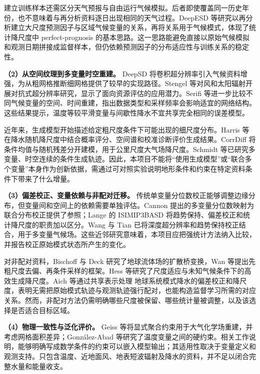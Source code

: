 建立训练样本还需区分天气预报与自由运行气候模拟。后者即使覆盖同一历史年份，也不意味着与再分析资料逐日出现相同的天气过程。DeepESD 等研究以再分析建立大尺度预测因子与区域气候变量的关系，再将关系用于气候模式，体现了统计降尺度中 perfect-prognosis 的基本思路\cite{Bano2022DeepESD}。这一思路能避免直接以原始气候模拟和观测日期拼接成监督样本，但仍依赖预测因子的分布适应性与训练关系的稳定性。

\textbf{（2）从空间纹理到多变量时空重建。}
DeepSD 将卷积超分辨率引入气候资料增强，为从粗网格推断细网格提供了较早的实现路径\cite{DeepSD2017}。Stengel 等对风和太阳辐射开展对抗式超分辨率研究，显示了面向资源评估的应用潜力\cite{Stengel2020}。Serifi 等进一步比较不同气候变量的空间、时间重建，指出数据类型和采样频率会影响适宜的网络结构\cite{Serifi2021}。这些结果提示，温度等较平滑变量与间歇性降水不宜共享完全相同的误差模型。

近年来，生成模型开始描述给定粗尺度条件下可能出现的细尺度分布。Harris 等在降水随机降尺度中结合概率评分、空间谱和校准诊断评价生成结果\cite{Harris2022}。CorrDiff 将条件均值与随机残差分开建模，用于公里尺度大气场降尺度\cite{Mardani2025CorrDiff}。Schmidt 等已研究多变量、时空连续的条件生成轨迹\cite{Schmidt2025Coherent}。因此，本项目不能将“使用生成模型”或“联合多个变量”本身作为创新依据，需通过可对照实验说明地形条件和约束在特定资料条件下带来了什么增量。

\textbf{（3）偏差校正、变量依赖与非配对迁移。}
传统单变量分位数校正能够调整边缘分布，但变量间和空间上的依赖需要单独评估。Cannon 提出的多变量分位数映射为联合分布校正提供了参照\cite{Cannon2018MBCn}；Lange 的 ISIMIP3BASD 将趋势保持、偏差校正和统计降尺度的职责加以区分\cite{Lange2019ISIMIP}。Wang 与 Tian 已将深度超分辨率和趋势保持校正结合，用于多变量气候场\cite{Trend2024}。这些近邻研究意味着，本项目应把强统计方法纳入比较，并报告校正原始模式状态所产生的变化。

对非配对资料，Bischoff 与 Deck 研究了地球流体场的扩散桥变换\cite{Bischoff2024Unpaired}，Wan 等提出先粗尺度去偏、再条件采样的框架\cite{Wan2023}。Hess 等研究了尺度适应与未知气候条件下的高效生成降尺度\cite{Hess2025Scale}。Aich 等通过共享表示处理 地球系统模式降水的偏差校正和降尺度，表明无需把原始模式轨迹与观测轨迹强行配对，也能构造监督学习所需的对应关系\cite{Aich2026Diffusion}。然而，非配对方法仍需明确哪些尺度被保留、哪些统计量被调整，以及该选择是否适合目标区域。

\textbf{（4）物理一致性与泛化评价。}
Geiss 等将显式聚合约束用于大气化学场重建，并考虑网格面积差异\cite{Geiss2022}；González-Abad 等研究了温度变量之间的硬约束\cite{Gonzalez2024Hard}。相关工作说明，能够明确写成数学条件的约束可以嵌入模型输出；其适用性取决于变量定义和观测支持。只包含温度、近地面风、地表短波辐射及降水的资料，并不足以闭合完整水量和能量收支。

